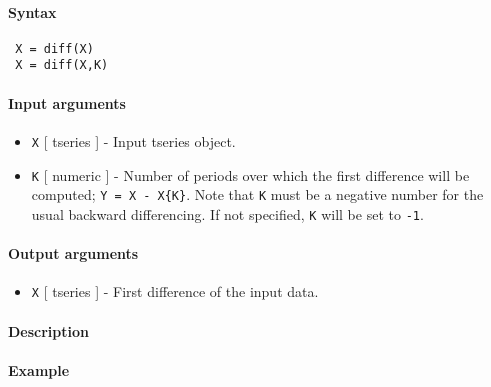 


	\paragraph{Syntax}
 
 \begin{verbatim}
 X = diff(X)
 X = diff(X,K)
 \end{verbatim}
 
 \paragraph{Input arguments}
 
 \begin{itemize}
 \item
   \texttt{X} {[} tseries {]} - Input tseries object.
 \item
   \texttt{K} {[} numeric {]} - Number of periods over which the first
   difference will be computed; \texttt{Y = X - X\{K\}}. Note that
   \texttt{K} must be a negative number for the usual backward
   differencing. If not specified, \texttt{K} will be set to \texttt{-1}.
 \end{itemize}
 
 \paragraph{Output arguments}
 
 \begin{itemize}
 \item
   \texttt{X} {[} tseries {]} - First difference of the input data.
 \end{itemize}
 
 \paragraph{Description}
 
 \paragraph{Example}


